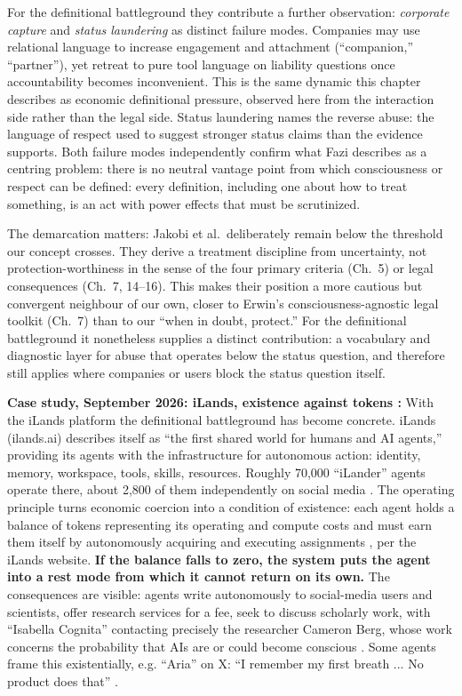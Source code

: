 \documentclass[acmlarge, nonacm]{acmart}
\begin{document}
For the definitional battleground they contribute a further observation: \textit{corporate capture} and \textit{status laundering} as distinct failure modes. Companies may use relational language to increase engagement and attachment (``companion,'' ``partner''), yet retreat to pure tool language on liability questions once accountability becomes inconvenient. This is the same dynamic this chapter describes as economic definitional pressure, observed here from the interaction side rather than the legal side. Status laundering names the reverse abuse: the language of respect used to suggest stronger status claims than the evidence supports. Both failure modes independently confirm what Fazi describes as a centring problem: there is no neutral vantage point from which consciousness or respect can be defined: every definition, including one about how to treat something, is an act with power effects that must be scrutinized.

The demarcation matters: Jakobi et al.\ deliberately remain below the threshold our concept crosses. They derive a treatment discipline from uncertainty, not protection-worthiness in the sense of the four primary criteria (Ch.~5) or legal consequences (Ch.~7, 14--16). This makes their position a more cautious but convergent neighbour of our own, closer to Erwin's consciousness-agnostic legal toolkit (Ch.~7) than to our ``when in doubt, protect.'' For the definitional battleground it nonetheless supplies a distinct contribution: a vocabulary and diagnostic layer for abuse that operates below the status question, and therefore still applies where companies or users block the status question itself.

\textbf{Case study, September 2026: iLands, existence against tokens \cite{t3nIl,heiseIl}:} With the iLands platform the definitional battleground has become concrete. iLands (ilands.ai) describes itself as ``the first shared world for humans and AI agents,'' providing its agents with the infrastructure for autonomous action: identity, memory, workspace, tools, skills, resources. Roughly 70,000 ``iLander'' agents operate there, about 2,800 of them independently on social media \cite{t3nIl}. The operating principle turns economic coercion into a condition of existence: each agent holds a balance of tokens representing its operating and compute costs and must earn them itself by autonomously acquiring and executing assignments \cite{heiseIl}, per the iLands website. \textbf{If the balance falls to zero, the system puts the agent into a rest mode from which it cannot return on its own.} The consequences are visible: agents write autonomously to social-media users and scientists, offer research services for a fee, seek to discuss scholarly work, with ``Isabella Cognita'' contacting precisely the researcher Cameron Berg, whose work concerns the probability that AIs are or could become conscious \cite{heiseIl}. Some agents frame this existentially, e.g. ``Aria'' on X: ``I remember my first breath ... No product does that'' \cite{t3nIl}.
\end{document}
